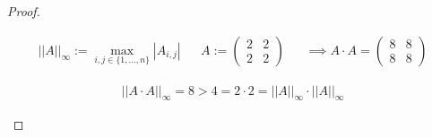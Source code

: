\documentclass[]{article}
\newcommand{\norm}[1]{\left|\left|#1\right|\right|}
\begin{document}
\begin{proof}
\begin{enumerate}[label=\alph*)]
		\begin{align*}
			\norm{A}_\infty := \max_{i,j\in\{1,...,n\}}|A_{i,j}| &&
			A:= \begin{pmatrix}
				2 & 2\\
				2 & 2
			\end{pmatrix} && \implies A\cdot A = \begin{pmatrix}
				8 & 8\\
				8 & 8
			\end{pmatrix}
		\end{align*}
	
		\begin{align*}
			\norm{A\cdot A}_\infty = 8 > 4 = 2 \cdot 2 = \norm{A}_\infty \cdot \norm{A}_\infty
		\end{align*}
		
	\end{enumerate}
\end{proof}
\end{document}
